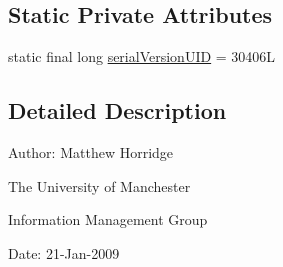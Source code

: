 \subsection*{Static Private Attributes}
\begin{DoxyCompactItemize}
\item 
static final long \hyperlink{classorg_1_1semanticweb_1_1owlapi_1_1reasoner_1_1_illegal_configuration_exception_a7d0fc720480d6768f9007c9412c4e7fc}{serial\-Version\-U\-I\-D} = 30406\-L
\end{DoxyCompactItemize}


\subsection{Detailed Description}
Author\-: Matthew Horridge\par
 The University of Manchester\par
 Information Management Group\par
 Date\-: 21-\/\-Jan-\/2009 

